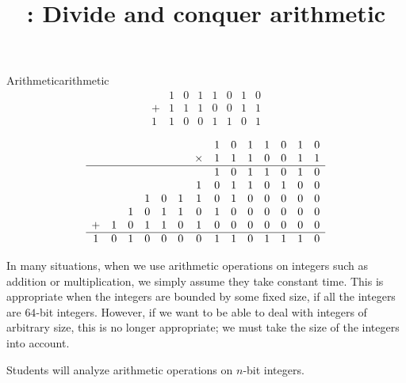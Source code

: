 \documentclass{tufte-handout}
\title{\thecourse: Divide and conquer arithmetic}
\date{}
\begin{document}
\maketitle


\begin{model*}{Arithmetic}{arithmetic}
  \[
    \begin{array}{cccccccc}
         & 1 & 0 & 1 & 1 & 0 & 1 & 0 \\
       + & 1 & 1 & 1 & 0 & 0 & 1 & 1 \\
      \hline
       1 & 1 & 0 & 0 & 1 & 1 & 0 & 1
    \end{array}
  \] \vspace{0.3in}

  \[
    \begin{array}{cccccccccccccc}
  & & & & & & &1&0&1&1&0&1&0 \\
  & & & & & &\times&1&1&1&0&0&1&1 \\
  \hline
  & & & & & & &1&0&1&1&0&1&0 \\
  & & & & & &1&0&1&1&0&1&0&0 \\
  & & &1&0&1&1&0&1&0&0&0&0&0 \\
  & &1&0&1&1&0&1&0&0&0&0&0&0 \\
 +&1&0&1&1&0&1&0&0&0&0&0&0&0 \\
 \hline
 1&0&1&0&0&0&0&1&1&0&1&1&1&0
    \end{array}
  \] \vspace{0.3in}
\end{model*}

In many situations, when we use arithmetic operations on integers such
as addition or multiplication, we simply assume they take constant
time.  This is appropriate when the integers are bounded by some fixed
size, \eg if all the integers are $64$-bit integers.  However, if we
want to be able to deal with integers of arbitrary size, this is no
longer appropriate; we must take the size of the integers into account.

\begin{objective}
  Students will analyze arithmetic operations on $n$-bit integers.
\end{objective}
\end{document}
